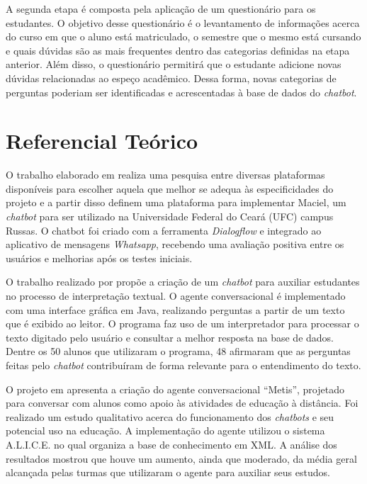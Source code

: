 \documentclass[12pt]{article}
\begin{document}
A segunda etapa é composta pela aplicação de um questionário para os estudantes. O objetivo desse questionário é o levantamento de informações acerca do curso em que o aluno está matriculado, o semestre que o mesmo está cursando e quais dúvidas são as mais frequentes dentro das categorias definidas na etapa anterior. Além disso, o questionário permitirá que o estudante adicione novas dúvidas relacionadas ao espeço acadêmico. Dessa forma, novas categorias de perguntas poderiam ser identificadas e acrescentadas à base de dados do {\itshape chatbot}.


\section{ Referencial Teórico}

O trabalho elaborado em \cite{maciel:19} realiza uma pesquisa entre diversas plataformas disponíveis para escolher aquela que melhor se adequa às especificidades do projeto e a partir disso definem uma plataforma para implementar Maciel, um {\itshape chatbot} para ser utilizado na Universidade Federal do Ceará (UFC) campus Russas. O chatbot foi criado com a ferramenta {\itshape Dialogflow} e integrado ao aplicativo de mensagens {\itshape Whatsapp}, recebendo uma avaliação positiva entre os usuários e melhorias após os testes iniciais.

O trabalho realizado por \cite{bulhoes:20} propõe a criação de um {\itshape chatbot} para auxiliar estudantes no processo de interpretação textual. O agente conversacional é implementado com uma interface gráfica em Java, realizando perguntas a partir de um texto que é exibido ao leitor. O programa faz uso de um interpretador para processar o texto digitado pelo usuário e consultar a melhor resposta na base de dados. Dentre os 50 alunos que utilizaram o programa, 48 afirmaram que as perguntas feitas pelo {\itshape chatbot} contribuíram de forma relevante para o entendimento do texto.


O projeto em \cite{lucchesi:18} apresenta a criação do agente conversacional “Metis”, projetado para conversar com alunos como apoio às atividades de educação à distância. Foi realizado um estudo qualitativo acerca do funcionamento dos {\itshape chatbots} e seu potencial uso na educação. A implementação do agente utilizou o sistema A.L.I.C.E. no qual organiza a base de conhecimento em XML. A análise dos resultados mostrou que houve um aumento, ainda que moderado, da média geral alcançada pelas turmas que utilizaram o agente para auxiliar seus estudos.
\end{document}
